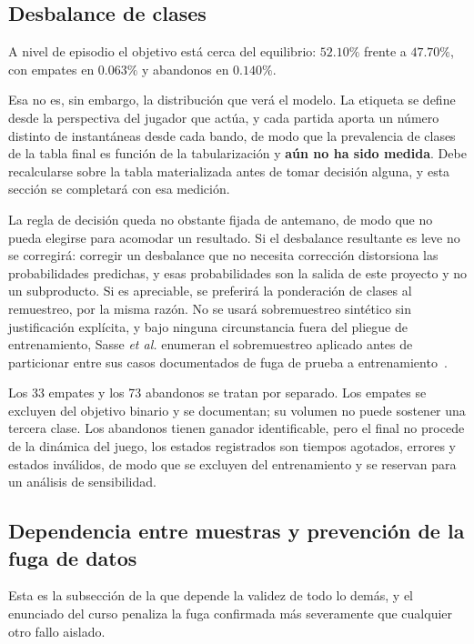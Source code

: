 \documentclass[conference]{IEEEtran}
\begin{document}
\subsection{Desbalance de clases}
\label{subsec:imbalance}

A nivel de episodio el objetivo est\'a cerca del equilibrio: $52.10\%$
frente a $47.70\%$, con empates en $0.063\%$ y abandonos en
$0.140\%$.

Esa no es, sin embargo, la distribuci\'on que ver\'a el modelo. La etiqueta
se define desde la perspectiva del jugador que act\'ua, y cada partida aporta
un n\'umero distinto de instant\'aneas desde cada bando, de modo que la
prevalencia de clases de la tabla final es funci\'on de la tabularizaci\'on y
\textbf{a\'un no ha sido medida}. Debe recalcularse sobre la tabla
materializada antes de tomar decisi\'on alguna, y esta secci\'on se
completar\'a con esa medici\'on.

La regla de decisi\'on queda no obstante fijada de antemano, de modo que no
pueda elegirse para acomodar un resultado. Si el desbalance resultante es
leve no se corregir\'a: corregir un desbalance que no necesita correcci\'on
distorsiona las probabilidades predichas, y esas probabilidades son la salida
de este proyecto y no un subproducto. Si es apreciable, se preferir\'a la
ponderaci\'on de clases al remuestreo, por la misma raz\'on. No se usar\'a
sobremuestreo sint\'etico sin justificaci\'on expl\'icita, y bajo ninguna
circunstancia fuera del pliegue de entrenamiento, Sasse \textit{et al.}
enumeran el sobremuestreo aplicado antes de particionar entre sus casos
documentados de fuga de prueba a entrenamiento~\cite{sasse_leakage_2025}.

Los 33 empates y los 73 abandonos se tratan por separado. Los empates se
excluyen del objetivo binario y se documentan; su volumen no puede sostener
una tercera clase. Los abandonos tienen ganador identificable, pero el final
no procede de la din\'amica del juego, los estados registrados son tiempos
agotados, errores y estados inv\'alidos, de modo que se excluyen del
entrenamiento y se reservan para un an\'alisis de sensibilidad.

\subsection{Dependencia entre muestras y prevenci\'on de la fuga de datos}
\label{subsec:leakage}

Esta es la subsecci\'on de la que depende la validez de todo lo dem\'as, y
el enunciado del curso penaliza la fuga confirmada m\'as severamente que
cualquier otro fallo aislado.
\end{document}
